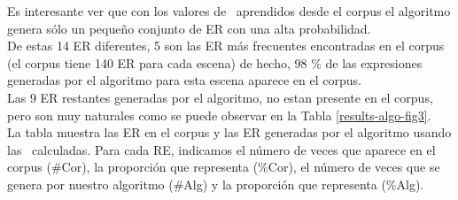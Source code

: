 

 Es interesante ver que con los
valores de \puse\ aprendidos desde el corpus el algoritmo genera s\'olo un peque\~no conjunto de ER con una alta probabilidad.\\

De estas 14 ER diferentes, 5 son las ER m\'as frecuentes encontradas en el corpus (el corpus tiene 140 ER para cada escena) de hecho, 98 \% de las expresiones generadas por el algoritmo para esta escena aparece en el corpus.\\

Las 9 ER restantes generadas por el algoritmo, no estan presente en el corpus, pero son muy naturales como se puede observar en la Tabla
\ref{results-algo-fig3}.\\

La tabla muestra las ER en el corpus y las ER generadas por el algoritmo usando las \puse\ calculadas. Para cada RE, indicamos el n\'umero de veces que aparece en el corpus (\#Cor), la proporci\'on que representa (\%Cor), el n\'umero de veces que se genera por nuestro algoritmo (\#Alg) y la proporci\'on que representa (\%Alg). \\

